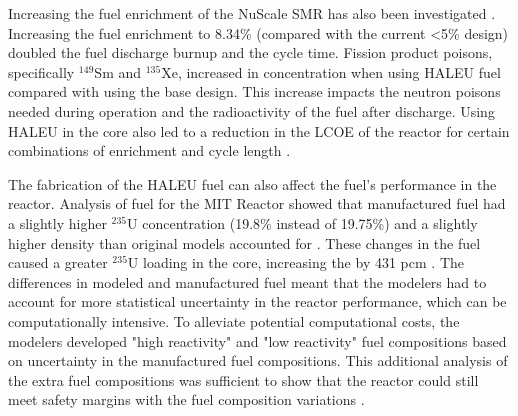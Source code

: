 Increasing the fuel enrichment of the NuScale \gls{SMR} has also been 
investigated \cite{carlson_implications_2022}. Increasing the fuel 
enrichment to 8.34\% (compared with the current <5\% design) doubled 
the fuel discharge burnup and the cycle time. 
Fission product poisons, specifically $^{149}$Sm and $^{135}$Xe, increased 
in concentration when using \gls{HALEU} fuel compared with using the base 
design. This increase impacts the 
neutron poisons needed during operation and the radioactivity of 
the fuel after discharge. Using \gls{HALEU} in the core also led to a 
reduction in the \gls{LCOE} of the reactor for certain combinations of 
enrichment and cycle length \cite{carlson_economic_2020,carlson_implications_2022}.

The fabrication of the \gls{HALEU} fuel can also affect the fuel's 
performance in the reactor. Analysis of fuel for the \gls{MIT} 
Reactor showed that manufactured fuel had a slightly higher $^{235}$U 
concentration (19.8\% instead of 19.75\%) and a slightly higher 
density than original models accounted for \cite{mascolino_impact_2022}. 
These changes in the fuel caused a greater $^{235}$U loading in the core, 
increasing the \keff by 431 pcm \cite{mascolino_impact_2022}. The 
differences in modeled and manufactured fuel meant that the modelers 
had to account for more statistical uncertainty in the reactor performance, 
which can be computationally intensive. To alleviate potential 
computational costs, the modelers developed "high reactivity" and 
"low reactivity" fuel compositions based on uncertainty in the manufactured 
fuel compositions. This additional analysis of the extra fuel compositions 
was sufficient to show that the reactor could still meet safety margins 
with the fuel composition variations \cite{mascolino_impact_2022}.

